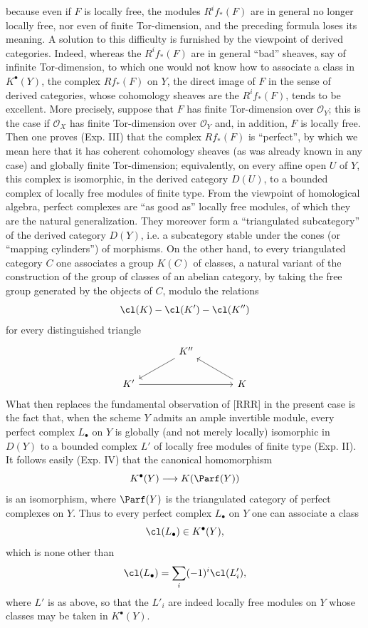 because even if $F$ is locally free, the modules $R^if_*(F)$ are in general no longer locally free, nor even of finite Tor-dimension, and the preceding formula loses its meaning. A solution to this difficulty is furnished by the viewpoint of derived categories. Indeed, whereas the $R^if_*(F)$ are in general ``bad'' sheaves, say of infinite Tor-dimension, to which one would not know how to associate a class in $K^\bullet(Y)$, the complex $Rf_*(F)$ on $Y$, the direct image of $F$ in the sense of derived categories, whose cohomology sheaves are the $R^if_*(F)$, tends to be excellent. More precisely, suppose that $F$ has finite Tor-dimension over $\mathcal O_Y$; this is the case if $\mathcal O_X$ has finite Tor-dimension over $\mathcal O_Y$ and, in addition, $F$ is locally free. Then one proves (Exp. III) that the complex $Rf_*(F)$ is ``perfect'', by which we mean here that it has coherent cohomology sheaves (as was already known in any case) and globally finite Tor-dimension; equivalently, on every affine open $U$ of $Y$, this complex is isomorphic, in the derived category $D(U)$, to a bounded complex of locally free modules of finite type. From the viewpoint of homological algebra, perfect complexes are ``as good as'' locally free modules, of which they are the natural generalization. They moreover form a ``triangulated subcategory'' of the derived category $D(Y)$, i.e. a subcategory stable under the cones (or ``mapping cylinders'') of morphisms. On the other hand, to every triangulated category $C$ one associates a group $K(C)$ of classes, a natural variant of the construction of the group of classes of an abelian category, by taking the free group generated by the objects of $C$, modulo the relations
\[
\cl(K)-\cl(K')-\cl(K'')
\]
for every distinguished triangle
\[
\begin{tikzcd}[column sep=large]
 & K'' \arrow[dl] & \\
K' \arrow[rr] && K \arrow[ul]
\end{tikzcd}
\]
What then replaces the fundamental observation of [RRR] in the present case is the fact that, when the scheme $Y$ admits an ample invertible module, every perfect complex $L_\bullet$ on $Y$ is globally (and not merely locally) isomorphic in $D(Y)$ to a bounded complex $L'$ of locally free modules of finite type (Exp. II). It follows easily (Exp. IV) that the canonical homomorphism
\[
K^\bullet(Y)\longrightarrow K(\Parf(Y))
\]
is an isomorphism, where $\Parf(Y)$ is the triangulated category of perfect complexes on $Y$. Thus to every perfect complex $L_\bullet$ on $Y$ one can associate a class
\[
\cl(L_\bullet)\in K^\bullet(Y),
\]
which is none other than
\[
\cl(L_\bullet)=\sum_i(-1)^i\cl(L'_i),
\]
where $L'$ is as above, so that the $L'_i$ are indeed locally free modules on $Y$ whose classes may be taken in $K^\bullet(Y)$.

